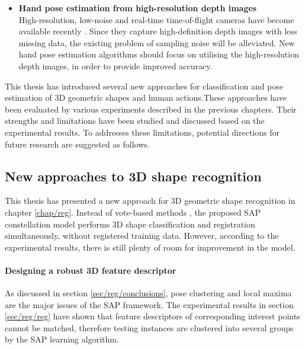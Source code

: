 \begin{itemize}
	\item \textbf{Hand pose estimation from high-resolution depth images}\\
	High-resolution, low-noise and real-time time-of-flight cameras have become available recently \cite{Nair2012}. Since they capture high-definition depth images with less missing data, the existing problem of sampling noise will be alleviated. New hand pose estimation algorithms should focus on utilising the high-resolution depth images, in order to provide improved accuracy.  
\end{itemize}
\fi

This thesis has introduced several new approaches for classification and pose estimation of 3D geometric shapes and human actions.These approaches have been evaluated by various experiments described in the previous chapters. Their strengths and limitations have been studied and discussed based on the experimental results. To addresses these limitations, potential directions for future research are suggested as follows.

\subsection{New approaches to 3D shape recognition}

This thesis has presented a new approach for 3D geometric shape recognition in chapter \ref{chap/reg}. Instead of vote-based methods \cite{Flitton2010, Knopp2010, Pham2011}, the proposed SAP constellation model performs 3D shape classification and registration simultaneously, without registered training data. However, according to the experimental results, there is still plenty of room for improvement in the model. 

\paragraph{Designing a robust 3D feature descriptor}

As discussed in section \ref{sec/reg/conclusions}, pose clustering and local maxima are the major issues of the SAP framework. The experimental results in section \ref{sec/reg/reg} have shown that feature descriptors of corresponding interest points cannot be matched, therefore testing instances are clustered into several groups by the SAP learning algorithm.  

